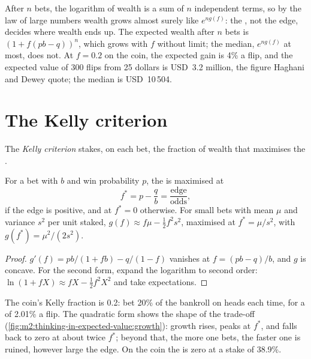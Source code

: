 After $n$ bets, the logarithm of wealth is a sum of $n$ independent terms, so by the law
of large numbers wealth grows almost surely like $e^{n g(f)}$: the , not the
edge, decides where wealth ends up. The expected wealth after $n$ bets is $(1 + f(pb -
q))^n$, which grows with $f$ without limit; the median, $e^{n g(f)}$ at most, does not. At
$f = 0.2$ on the coin, the expected gain is 4\% a flip, and the expected value of 300 flips
from 25 dollars is USD~3.2 million, the figure Haghani and Dewey quote; the median is
USD~10\,504.

\section{The Kelly criterion}

\begin{definition}\label{def:m2:thinking-in-expected-value:kelly}
The \emph{Kelly criterion} stakes, on each bet, the fraction of
wealth that maximises the .
\end{definition}

\begin{proposition}\label{prop:m2:thinking-in-expected-value:kelly}
For a bet with  $b$ and win probability $p$, the  is maximised at
\[
f^* = p - \frac{q}{b} = \frac{\text{edge}}{\text{odds}},
\]
if the edge is positive, and at $f^* = 0$ otherwise. For small bets with mean $\mu$ and
variance $s^2$ per unit staked, $g(f) \approx f\mu - \tfrac12 f^2 s^2$, maximised at $f^* =
\mu / s^2$, with $g(f^*) = \mu^2 / (2s^2)$.
\end{proposition}

\begin{proof}
$g'(f) = pb/(1 + fb) - q/(1 - f)$ vanishes at $f = (pb - q)/b$, and $g$ is concave. For the
second form, expand the logarithm to second order: $\ln(1 + fX) \approx fX - \tfrac12 f^2X^2$
and take expectations.
\end{proof}

The coin's Kelly fraction is 0.2: bet 20\% of the bankroll on heads each time, for a  of 2.01\% a flip. The quadratic form shows the shape of the trade-off
(\cref{fig:m2:thinking-in-expected-value:growth}): growth rises, peaks at $f^*$, and falls
back to zero at about twice $f^*$; beyond that, the more one bets, the faster one is ruined,
however large the edge. On the coin the  is zero at a stake of 38.9\%.

